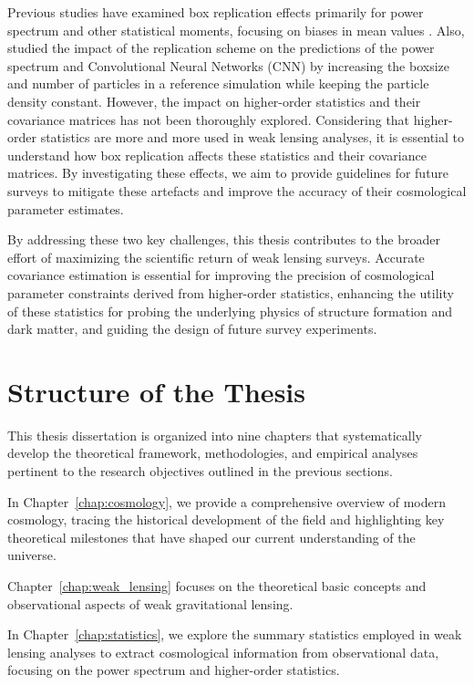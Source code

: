 Previous studies have examined box replication effects primarily for power spectrum and other statistical moments, focusing on biases in mean values \citep{2024MNRAS.534.1205C}. Also, \citet{2019PhRvD.100f3514F} studied the impact of the replication scheme on the predictions of the power spectrum and Convolutional Neural Networks (CNN) by increasing the boxsize and number of particles in a reference simulation while keeping the particle density constant. 
However, the impact on higher-order statistics and their covariance matrices has not been thoroughly explored. Considering that higher-order statistics are more and more used in weak lensing analyses, it is essential to understand how box replication affects these statistics and their covariance matrices. By investigating these effects, we aim to provide guidelines for future surveys to mitigate these artefacts and improve the accuracy of their cosmological parameter estimates.

By addressing these two key challenges, this thesis contributes to the broader effort of maximizing the scientific return of weak lensing surveys. Accurate covariance estimation is essential for improving the precision of cosmological parameter constraints derived from higher-order statistics, enhancing the utility of these statistics for probing the underlying physics of structure formation and dark matter, and guiding the design of future survey experiments.

\section{Structure of the Thesis}
This thesis dissertation is organized into nine chapters that systematically develop the theoretical framework, methodologies, and empirical analyses pertinent to the research objectives outlined in the previous sections.

In Chapter~\ref{chap:cosmology}, we provide a comprehensive overview of modern cosmology, tracing the historical development of the field and highlighting key theoretical milestones that have shaped our current understanding of the universe. 

Chapter~\ref{chap:weak_lensing} focuses on the theoretical basic concepts and observational aspects of weak gravitational lensing. 

In Chapter~\ref{chap:statistics}, we explore the summary statistics employed in weak lensing analyses to extract cosmological information from observational data, focusing on the power spectrum and higher-order statistics. 

